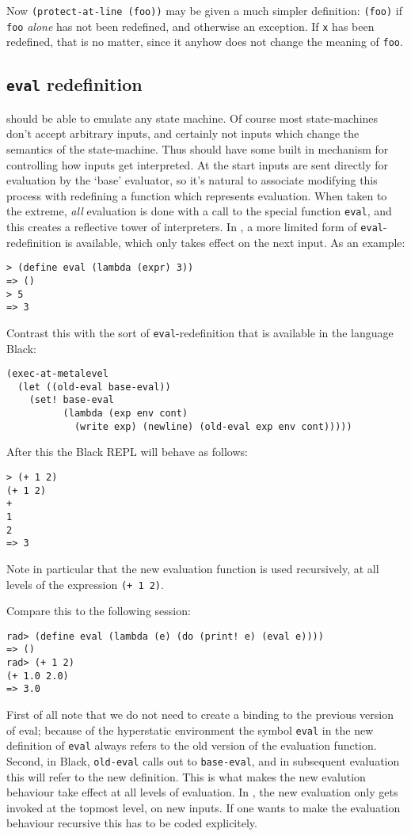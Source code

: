 Now \texttt{(protect-at-line (foo))} may be given a much simpler definition:
\texttt{(foo)} if \texttt{foo} \emph{alone} has not been redefined, and otherwise
an exception. If \texttt{x} has been redefined, that is no matter, since it
anyhow does not change the meaning of \texttt{foo}.


\subsection{\texttt{eval} redefinition}

\rad should be able to emulate any state machine. Of course most state-machines
don't accept arbitrary inputs, and certainly not inputs which change the
semantics of the state-machine. Thus \rad should have some built in mechanism
for controlling how inputs get interpreted. At the start inputs are sent
directly for evaluation by the `base' evaluator, so it's natural to associate
modifying this process with redefining a function which represents evaluation.
When taken to the extreme, \emph{all} evaluation is done with a call to the
special function \texttt{eval}, and this creates a reflective tower of
interpreters. In \rad, a more limited form of \texttt{eval}-redefinition is
available, which only takes effect on the next input. As an example:
\begin{verbatim}
> (define eval (lambda (expr) 3))
=> ()
> 5
=> 3
\end{verbatim}

Contrast this with the sort of \texttt{eval}-redefinition that is available in the language Black:
\begin{verbatim}
(exec-at-metalevel
  (let ((old-eval base-eval))
    (set! base-eval
          (lambda (exp env cont)
            (write exp) (newline) (old-eval exp env cont)))))
\end{verbatim}
After this the Black REPL will behave as follows:
\begin{verbatim}
> (+ 1 2)
(+ 1 2)
+
1
2
=> 3
\end{verbatim}
Note in particular that the new evaluation function is used recursively, at all
levels of the expression \texttt{(+ 1 2)}.

Compare this to the following \rad session:
\begin{verbatim}
rad> (define eval (lambda (e) (do (print! e) (eval e))))
=> ()
rad> (+ 1 2)
(+ 1.0 2.0)
=> 3.0
\end{verbatim}
First of all note that we do not need to create a binding to the previous
version of eval; because of the hyperstatic environment the symbol \texttt{eval}
in the new definition of \texttt{eval} always refers to the old version of the
evaluation function. Second, in Black, \texttt{old-eval} calls out to
\texttt{base-eval}, and in subsequent evaluation this will refer to the new
definition. This is what makes the new evalution behaviour take effect at all
levels of evaluation. In \rad, the new evaluation only gets invoked at the
topmost level, on new inputs. If one wants to make the evaluation behaviour
recursive this has to be coded explicitely.

